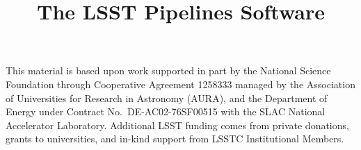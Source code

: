 \documentclass[twocolumn]{aastex62}
\begin{document}
\title{The LSST Pipelines Software}














\acknowledgments
This material is based upon work supported in part by the National Science Foundation through Cooperative Agreement 1258333 managed by the Association of Universities for Research in Astronomy (AURA), and the Department of Energy under Contract No.\ DE-AC02-76SF00515 with the SLAC National Accelerator Laboratory.
Additional LSST funding comes from private donations, grants to universities, and in-kind support from LSSTC Institutional Members.



\end{document}
